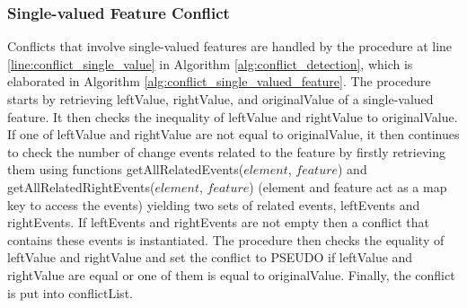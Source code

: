 \subsubsection{Single-valued Feature Conflict} 
\label{sec:single_valued_conflict}
Conflicts that involve single-valued features are handled by the procedure at line \ref{line:conflict_single_value} in Algorithm \ref{alg:conflict_detection}, which is elaborated in Algorithm \ref{alg:conflict_single_valued_feature}. The procedure starts by retrieving \textsf{leftValue}, \textsf{rightValue}, and \textsf{originalValue} of a single-valued feature. It then checks the inequality of \textsf{leftValue} and \textsf{rightValue} to \textsf{originalValue}. If one of \textsf{leftValue} and \textsf{rightValue} are not equal to \textsf{originalValue}, it then continues to check the number of change events related to the feature by firstly retrieving them using functions \textsf{getAllRelatedEvents($element$, $feature$)} and \textsf{getAllRelatedRightEvents($element$, $feature$)} (element and feature act as a map key to access the events) yielding two sets of related events, \textsf{leftEvents} and \textsf{rightEvents}. If \textsf{leftEvents} and \textsf{rightEvents} are not empty then a conflict that contains these events is instantiated. The procedure then checks the equality of \textsf{leftValue} and \textsf{rightValue} and set the conflict to \textsf{PSEUDO} if \textsf{leftValue} and \textsf{rightValue} are equal or one of them is equal to \textsf{originalValue}. Finally, the conflict is put into \textsf{conflictList}. 

